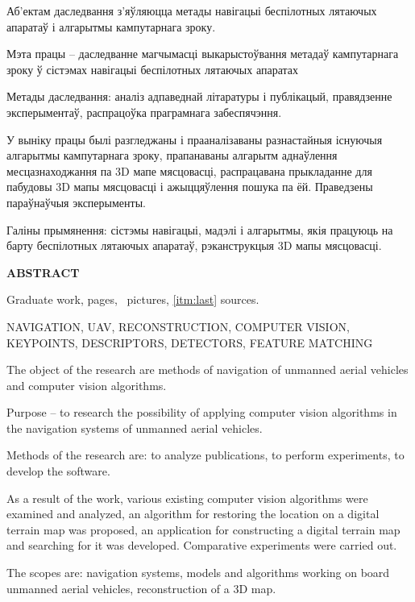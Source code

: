 Аб'ектам даследвання з'яўляюцца метады навігацыі беспілотных лятаючых апаратаў і алгарытмы кампутарнага зроку.

\vspace{1em}

Мэта працы -- даследванне магчымасці выкарыстоўвання метадаў кампутарнага зроку ў сістэмах навігацыі беспілотных лятаючых апаратах

\vspace{1em}

Метады даследвання: аналіз адпаведнай літаратуры і публікацый, правядзенне эксперыментаў, распрацоўка праграмнага забеспячэння.

\vspace{1em}

У выніку працы былі разгледжаны і прааналізаваны разнастайныя існуючыя алгарытмы кампутарнага зроку, прапанаваны алгарытм аднаўлення месцазнаходжання па 3D мапе мясцовасці, распрацавана прыкладанне для пабудовы 3D мапы мясцовасці і ажыццяўлення пошука па ёй. Праведзены параўнаўчыя эксперыменты.

\vspace{1em}


Галіны прымянення: сістэмы навігацыі, мадэлі і алгарытмы, якія працуюць на барту беспілотных лятаючых апаратаў, рэканструкцыя 3D мапы мясцовасці.
\newpage



\begin{center}
     \large\bfseries{ABSTRACT}
\end{center}

Graduate work, \pageref{LastPage} pages, \totalfigures\ pictures, \ref{itm:last} sources.

\begin{center}
  \large{NAVIGATION, UAV, RECONSTRUCTION, COMPUTER VISION, KEYPOINTS, DESCRIPTORS, DETECTORS, FEATURE MATCHING}
\end{center}

The object of the research are methods of navigation of unmanned aerial vehicles and computer vision algorithms.

\vspace{1em}


Purpose -- to research the possibility of applying computer vision algorithms in the navigation systems of unmanned aerial vehicles.

\vspace{1em}

Methods of the research are: to analyze publications, to perform experiments, to develop the software.

\vspace{1em}

As a result of the work, various existing computer vision algorithms were examined and analyzed, an algorithm for restoring the location on a digital terrain map was proposed, an application for constructing a digital terrain map and searching for it was developed. Comparative experiments were carried out.

\vspace{1em}


The scopes are: navigation systems, models and algorithms working on board unmanned aerial vehicles, reconstruction of a 3D map.
\newpage